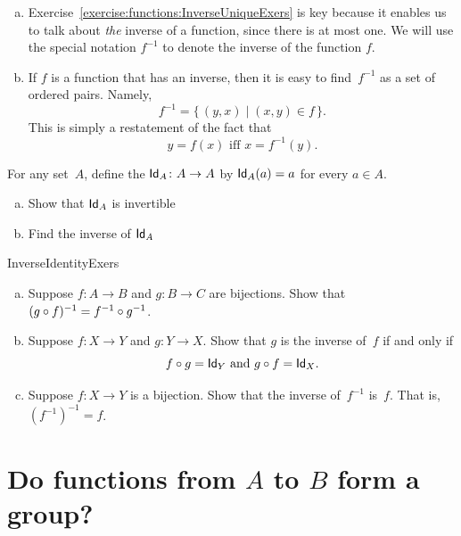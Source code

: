 \begin{rem}
\begin{enumerate}[(a)]
\item
Exercise~\ref{exercise:functions:InverseUniqueExers} is key because it enables us to talk about \emph{the} inverse of a function, since there is at most one. We will use the special notation $f^{-1}$ to denote the inverse of the function $f$.
\item
If $f$ is a function that has an inverse, then it is easy to find~$f^{-1}$ as a set of ordered pairs. Namely, 
$$ f^{-1} = \{\, (y,x) \mid (x,y) \in f \,\} .$$
This is simply a restatement of the fact that
 $$y = f(x) \text{ iff } x = f^{-1}(y) .$$
\end{enumerate}
\end{rem}

\begin{defn}\label{identityMap}
For any set~$A$, define the  ${\sf Id}_A \colon A \to A$ by ${\sf Id}_A(a) = a$ for every $a \in A$.
\end{defn} 

\begin{exercise}{98}
\begin{enumerate}[(a)]
\item
Show that ${\sf Id}_A$ is invertible
\item
Find the inverse of ${\sf Id}_A$
\end{enumerate}
\end{exercise}

\begin{exercise}{InverseIdentityExers}\ 
\begin{enumerate}[(a)]
\item \label{InverseIdentityExers-InvOfComp}
Suppose $f \colon A \to B$ and $g \colon B \to C$ are bijections. Show that $(g \circ f)^{-1} = f^{-1} \circ g^{-1}$.
\item \label{InverseIdentityExers-Comp=Id}
Suppose $f \colon X \to Y$ and $g \colon Y \to X$. Show that $g$ is the inverse of~$f$ if and only if
\[ f \circ g = {\sf Id}_Y \text{  and  }g \circ f = {\sf Id}_X .\]
\item \label{InverseIdentityExers-InvOfInv}
Suppose $f \colon X \to Y$ is a bijection. Show that the inverse of~$f^{-1}$ is~$f$. That is, $(f^{-1})^{-1} = f$.
\end{enumerate}
\end{exercise}

\section{Do functions from $A$ to $B$ form a group?}

